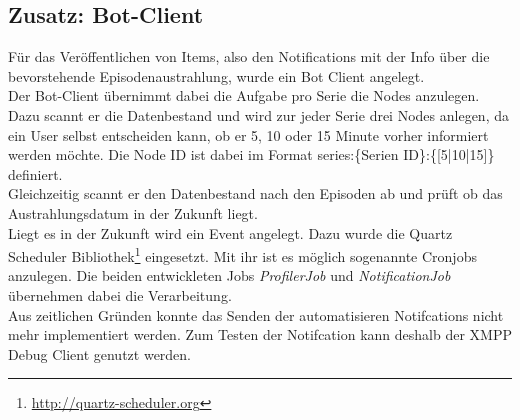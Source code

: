 \newpage

\subsection{Zusatz: Bot-Client}

Für das Veröffentlichen von Items, also den Notifications mit der Info über die bevorstehende Episodenaustrahlung, wurde ein Bot Client angelegt.\\
Der Bot-Client übernimmt dabei die Aufgabe pro Serie die Nodes anzulegen. Dazu scannt er die Datenbestand und wird zur jeder Serie drei Nodes anlegen, da ein User selbst entscheiden kann, ob er 5, 10 oder 15 Minute vorher informiert werden möchte. Die Node ID ist dabei im Format \textsf{series:\{Serien ID\}:\{[5|10|15]\}} definiert.\\
Gleichzeitig scannt er den Datenbestand nach den Episoden ab und prüft ob das Austrahlungsdatum in der Zukunft liegt.\\
Liegt es in der Zukunft wird ein Event angelegt. Dazu wurde die Quartz Scheduler Bibliothek\footnote{\url{http://quartz-scheduler.org}} eingesetzt. Mit ihr ist es möglich sogenannte Cronjobs anzulegen. Die beiden entwickleten Jobs \textit{ProfilerJob} und \textit{NotificationJob} übernehmen dabei die Verarbeitung.\\

Aus zeitlichen Gründen konnte  das Senden der automatisieren Notifcations nicht mehr implementiert werden. Zum Testen der Notifcation kann deshalb der XMPP Debug Client genutzt werden.
